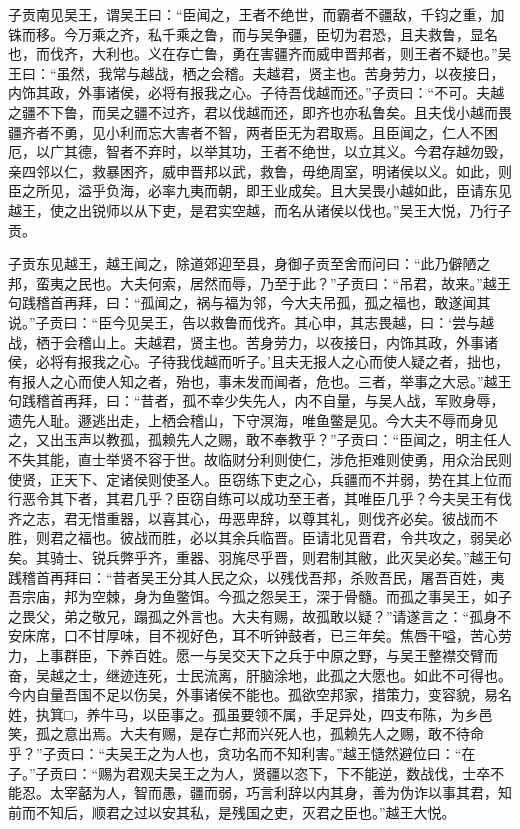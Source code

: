 \documentclass[12pt,UTF8]{ctexbook}
\begin{document}
子贡南见吴王，谓吴王曰：“臣闻之，王者不绝世，而霸者不疆敌，千钧之重，加铢而移。今万乘之齐，私千乘之鲁，而与吴争疆，臣切为君恐，且夫救鲁，显名也，而伐齐，大利也。义在存亡鲁，勇在害疆齐而威申晋邦者，则王者不疑也。”吴王曰：“虽然，我常与越战，栖之会稽。夫越君，贤主也。苦身劳力，以夜接日，内饰其政，外事诸侯，必将有报我之心。子待吾伐越而还。”子贡曰：“不可。夫越之疆不下鲁，而吴之疆不过齐，君以伐越而还，即齐也亦私鲁矣。且夫伐小越而畏疆齐者不勇，见小利而忘大害者不智，两者臣无为君取焉。且臣闻之，仁人不困厄，以广其德，智者不弃时，以举其功，王者不绝世，以立其义。今君存越勿毁，亲四邻以仁，救暴困齐，威申晋邦以武，救鲁，毋绝周室，明诸侯以义。如此，则臣之所见，溢乎负海，必率九夷而朝，即王业成矣。且大吴畏小越如此，臣请东见越王，使之出锐师以从下吏，是君实空越，而名从诸侯以伐也。”吴王大悦，乃行子贡。

子贡东见越王，越王闻之，除道郊迎至县，身御子贡至舍而问曰：“此乃僻陋之邦，蛮夷之民也。大夫何索，居然而辱，乃至于此？”子贡曰：“吊君，故来。”越王句践稽首再拜，曰：“孤闻之，祸与福为邻，今大夫吊孤，孤之福也，敢遂闻其说。”子贡曰：“臣今见吴王，告以救鲁而伐齐。其心申，其志畏越，曰：‘尝与越战，栖于会稽山上。夫越君，贤主也。苦身劳力，以夜接日，内饰其政，外事诸侯，必将有报我之心。子待我伐越而听子。’且夫无报人之心而使人疑之者，拙也，有报人之心而使人知之者，殆也，事未发而闻者，危也。三者，举事之大忌。”越王句践稽首再拜，曰：“昔者，孤不幸少失先人，内不自量，与吴人战，军败身辱，遗先人耻。遯逃出走，上栖会稽山，下守溟海，唯鱼鳖是见。今大夫不辱而身见之，又出玉声以教孤，孤赖先人之赐，敢不奉教乎？”子贡曰：“臣闻之，明主任人不失其能，直士举贤不容于世。故临财分利则使仁，涉危拒难则使勇，用众治民则使贤，正天下、定诸侯则使圣人。臣窃练下吏之心，兵疆而不并弱，势在其上位而行恶令其下者，其君几乎？臣窃自练可以成功至王者，其唯臣几乎？今夫吴王有伐齐之志，君无惜重器，以喜其心，毋恶卑辞，以尊其礼，则伐齐必矣。彼战而不胜，则君之福也。彼战而胜，必以其余兵临晋。臣请北见晋君，令共攻之，弱吴必矣。其骑士、锐兵弊乎齐，重器、羽旄尽乎晋，则君制其敝，此灭吴必矣。”越王句践稽首再拜曰：“昔者吴王分其人民之众，以残伐吾邦，杀败吾民，屠吾百姓，夷吾宗庙，邦为空棘，身为鱼鳖饵。今孤之怨吴王，深于骨髓。而孤之事吴王，如子之畏父，弟之敬兄，蹋孤之外言也。大夫有赐，故孤敢以疑？”请遂言之：“孤身不安床席，口不甘厚味，目不视好色，耳不听钟鼓者，已三年矣。焦唇干嗌，苦心劳力，上事群臣，下养百姓。愿一与吴交天下之兵于中原之野，与吴王整襟交臂而奋，吴越之士，继迹连死，士民流离，肝脑涂地，此孤之大愿也。如此不可得也。今内自量吾国不足以伤吴，外事诸侯不能也。孤欲空邦家，措策力，变容貌，易名姓，执箕□，养牛马，以臣事之。孤虽要领不属，手足异处，四支布陈，为乡邑笑，孤之意出焉。大夫有赐，是存亡邦而兴死人也，孤赖先人之赐，敢不待命乎？”子贡曰：“夫吴王之为人也，贪功名而不知利害。”越王慥然避位曰：“在子。”子贡曰：“赐为君观夫吴王之为人，贤疆以恣下，下不能逆，数战伐，士卒不能忍。太宰嚭为人，智而愚，疆而弱，巧言利辞以内其身，善为伪诈以事其君，知前而不知后，顺君之过以安其私，是残国之吏，灭君之臣也。”越王大悦。
\end{document}
